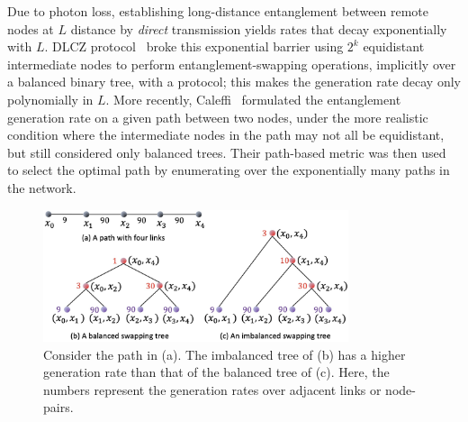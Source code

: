 Due to photon loss, establishing long-distance entanglement between remote
nodes at $L$ distance by \textit{direct} 
transmission yields \eps rates that decay exponentially with $L$. 
DLCZ protocol~\cite{dlcz,gisin} broke this exponential barrier using
$2^k$ equidistant intermediate nodes to perform entanglement-swapping operations, 
implicitly over a balanced binary tree, with a \wt protocol; this makes the 
\eps generation rate decay only polynomially in $L$. 
More recently, Caleffi~\cite{caleffi} formulated the entanglement generation rate on a given path between two nodes, under the more realistic condition where the intermediate nodes in the path may not all be equidistant, but still considered only balanced trees. Their path-based metric
was then used to select the optimal path by enumerating over the 
exponentially many paths in the network.

\begin{figure}
    \centering
    \includegraphics[width=0.8\textwidth]{chapters/tqe/figures/non-balanced-balanced.jpg}
    \caption{Consider the path in (a). The imbalanced tree of (b) has a higher \eps generation rate than that of the balanced tree of (c). Here, the numbers represent the \eps generation rates over adjacent links or node-pairs.} 
    \label{fig:swapping_non-balance}
\end{figure}


